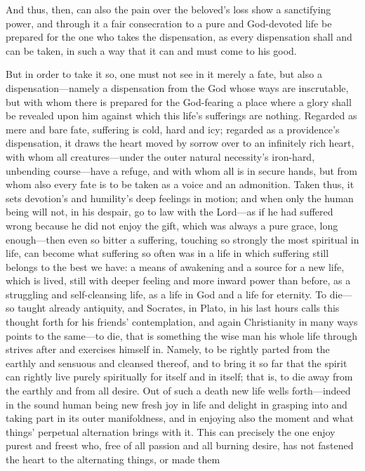 \documentclass[12pt,a4paper]{book}
\begin{document}
And thus, then, can also the pain over the beloved's loss show a sanctifying
power, and through it a fair consecration to a pure and God-devoted life be
prepared for the one who takes the dispensation, as every dispensation shall
and can be taken, in such a way that it can and must come to his good.

But in order to take it so, one must not see in it merely a fate, but also a
dispensation---namely a dispensation from the God whose ways are inscrutable,
but with whom there is prepared for the God-fearing a place where a glory
shall be revealed upon him against which this life's sufferings are nothing.
Regarded as mere and bare fate, suffering is cold, hard and icy; regarded as
a providence's dispensation, it draws the heart moved by sorrow over to an
infinitely rich heart, with whom all creatures---under the outer natural
necessity's iron-hard, unbending course---have a refuge, and with whom all
is in secure hands, but from whom also every fate is to be taken as a voice
and an admonition. Taken thus, it sets devotion's and humility's deep
feelings in motion; and when only the human being will not, in his despair,
go to law with the Lord---as if he had suffered wrong because he did not
enjoy the gift, which was always a pure grace, long enough---then even so
bitter a suffering, touching so strongly the most spiritual in life, can
become what suffering so often was in a life in which suffering still
belongs to the best we have: a means of awakening and a source for a new
life, which is lived, still with deeper feeling and more inward power than
before, as a struggling and self-cleansing life, as a life in God and a life
for eternity. To die---so taught already antiquity, and Socrates, in Plato,
in his last hours calls this thought forth for his friends' contemplation,
and again Christianity in many ways points to the same---to die, that is
something the wise man his whole life through strives after and exercises
himself in. Namely, to be rightly parted from the earthly and sensuous and
cleansed thereof, and to bring it so far that the spirit can rightly live
purely spiritually for itself and in itself; that is, to die away from the
earthly and from all desire. Out of such a death new life wells forth---indeed
in the sound human being new fresh joy in life and delight in grasping into
and taking part in its outer manifoldness, and in enjoying also the moment
and what things' perpetual alternation brings with it. This can precisely
the one enjoy purest and freest who, free of all passion and all burning
desire, has not fastened the heart to the alternating things, or made them
\end{document}
